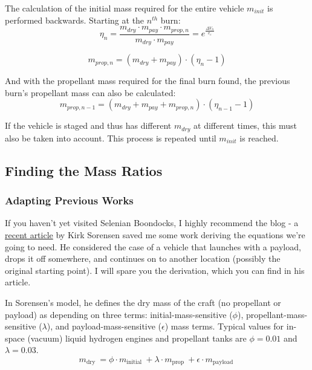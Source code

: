 \documentclass{article}
\begin{document}
The calculation of the initial mass required for the entire vehicle $m_{init}$ is performed backwards. Starting at the $n^{th}$ burn:
\begin{equation}
\eta_n = \frac{m_{dry} \cdot m_{pay} \cdot m_{prop,n}}{m_{dry} \cdot m_{pay}} = e^{ \frac{\Delta V_n}{v_e} }
\end{equation}

\begin{equation}
m_{prop, n} = (m_{dry} + m_{pay}) \cdot (\eta_n -1)
\end{equation}

And with the propellant mass required for the final burn found, the previous burn's propellant mass can also be calculated:
\begin{equation}
m_{prop, n-1} = (m_{dry} + m_{pay} + m_{prop, n}) \cdot (\eta_{n-1} -1)
\end{equation}

If the vehicle is staged and thus has different $m_{dry}$ at different times, this must also be taken into account. This process is repeated until $m_{init}$ is reached.

\subsection{Finding the Mass Ratios}
\subsubsection{Adapting Previous Works}
If you haven't yet visited Selenian Boondocks, I highly recommend the blog - a \href{https://selenianboondocks.com/2022/04/pf-derivation-split-dv-2/}{recent article} by Kirk Sorensen saved me some work deriving the equations we're going to need. He considered the case of a vehicle that launches with a payload, drops it off somewhere, and continues on to another location (possibly the original starting point). I will spare you the derivation, which you can find in his article.

In Sorensen's model, he defines the dry mass of the craft (no propellant or payload) as depending on three terms: initial-mass-sensitive ($\phi$), propellant-mass-sensitive ($\lambda$), and payload-mass-sensitive ($\epsilon$) mass terms. Typical values for in-space (vacuum) liquid hydrogen engines and propellant tanks are $\phi = 0.01$ and $\lambda = 0.03$.
\begin{equation}
m_{\text {dry }}=\phi \cdot m_{\text {initial }}+\lambda \cdot  m_{\text {prop }}+\epsilon \cdot m_{\text {payload }}
\end{equation}
\end{document}
